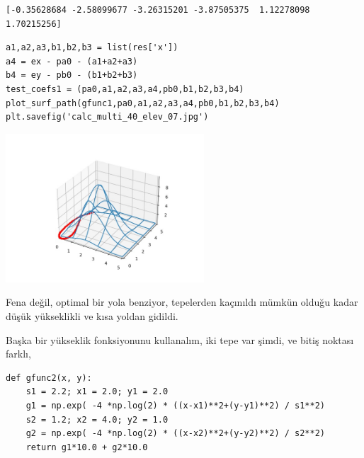 \documentclass[12pt,fleqn]{article}\usepackage{../../common}
\begin{document}
\begin{verbatim}
[-0.35628684 -2.58099677 -3.26315201 -3.87505375  1.12278098  1.70215256]
\end{verbatim}

\begin{verbatim}
a1,a2,a3,b1,b2,b3 = list(res['x'])
a4 = ex - pa0 - (a1+a2+a3)
b4 = ey - pb0 - (b1+b2+b3)
test_coefs1 = (pa0,a1,a2,a3,a4,pb0,b1,b2,b3,b4)
plot_surf_path(gfunc1,pa0,a1,a2,a3,a4,pb0,b1,b2,b3,b4)
plt.savefig('calc_multi_40_elev_07.jpg')
\end{verbatim}

\includegraphics[width=20em]{calc_multi_40_elev_07.jpg}

Fena değil, optimal bir yola benziyor, tepelerden kaçınıldı mümkün olduğu kadar
düşük yükseklikli ve kısa yoldan gidildi.

Başka bir yükseklik fonksiyonunu kullanalım, iki tepe var şimdi, ve
bitiş noktası farklı,

\begin{verbatim}
def gfunc2(x, y):
    s1 = 2.2; x1 = 2.0; y1 = 2.0
    g1 = np.exp( -4 *np.log(2) * ((x-x1)**2+(y-y1)**2) / s1**2)
    s2 = 1.2; x2 = 4.0; y2 = 1.0
    g2 = np.exp( -4 *np.log(2) * ((x-x2)**2+(y-y2)**2) / s2**2)
    return g1*10.0 + g2*10.0
\end{verbatim}
\end{document}
